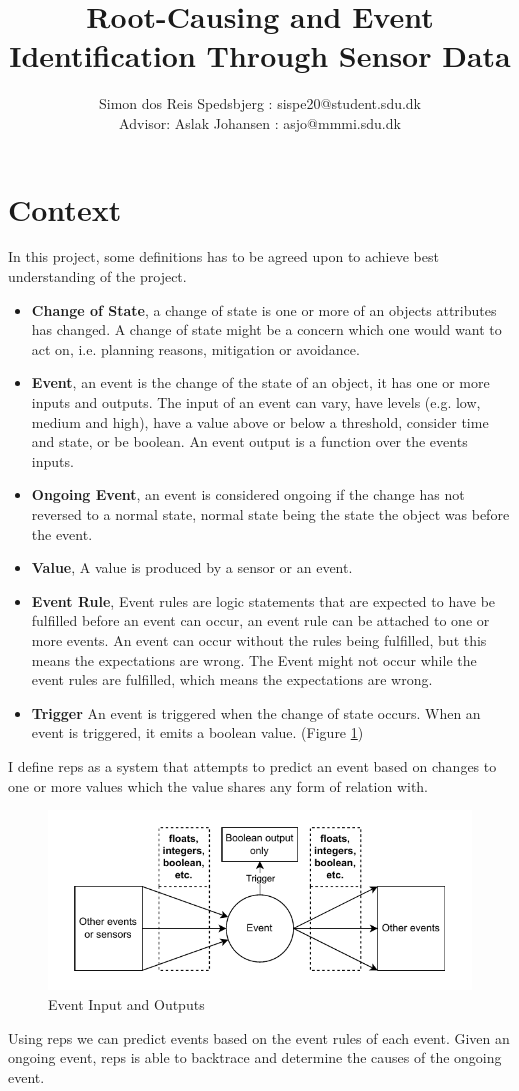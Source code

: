 \documentclass[a4paper,8pt]{article}
\title{Root-Causing and Event Identification Through Sensor Data}
\author{Simon dos Reis Spedsbjerg : sispe20@student.sdu.dk\\ {\small Advisor: Aslak Johansen : asjo@mmmi.sdu.dk}}
\begin{document}
	\maketitle
	\section{Context}
		
			In this project, some definitions has to be agreed upon to achieve best understanding of the project.
			\begin{itemize}
				\item \textbf{Change of State}, a change of state is one or more of an objects attributes has changed. A change of state might be a concern which one would want to act on, i.e. planning reasons, mitigation or avoidance.
				\item \textbf{Event}, an event is the change of the state of an object, it has one or more inputs and outputs. The input of an event can vary, have levels (e.g. low, medium and high), have a value above or below a threshold, consider time and state, or be boolean. An event output is a function over the events inputs.
				\item \textbf{Ongoing Event}, an event is considered ongoing if the change has not reversed to a normal state, normal state being the state the object was before the event.
				\item \textbf{Value}, A value is produced by a sensor or an event.
				\item \textbf{Event Rule}, Event rules are logic statements that are expected to have be fulfilled before an event can occur, an event rule can be attached to one or more events. An event can occur without the rules being fulfilled, but this means the expectations are wrong. The Event might not occur while the event rules are fulfilled, which means the expectations are wrong.%
				\item \textbf{Trigger} An event is triggered when the change of state occurs. When an event is triggered, it emits a boolean value. (Figure \ref{fig:eventInAOut})
			\end{itemize}
		I define \gls{reps} as a system that attempts to predict an event based on changes to one or more values which the value shares any form of relation with. 
		\begin{figure}[!h]
			\centering
			\includegraphics[width=.8\textwidth]{EventTrigger}
			\caption{Event Input and Outputs}
			\label{fig:eventInAOut}
		\end{figure}
		\newpage
		Using \gls{reps} we can predict events based on the event rules of each event. Given an ongoing event, \gls{reps} is able to backtrace and determine the causes of the ongoing event.
		
\end{document}
